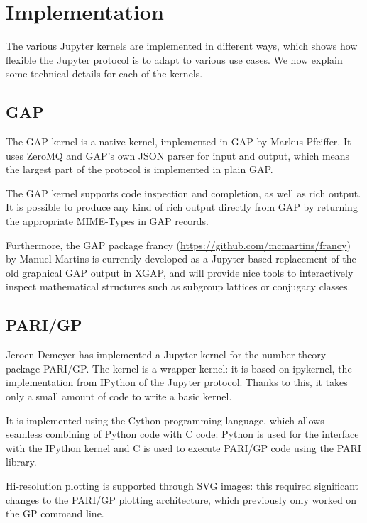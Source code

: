 \documentclass{deliverablereport}
\begin{document}

\section{Implementation}

The various Jupyter kernels are implemented in different ways, which shows how flexible
the Jupyter protocol is to adapt to various use cases. We now explain some technical details for each of the kernels.

\subsection{GAP}

The GAP kernel is a native kernel, implemented in GAP by Markus Pfeiffer. It uses ZeroMQ and GAP's own JSON
parser for input and output, which means the largest part of the protocol is implemented in plain GAP.

The GAP kernel supports code inspection and completion, as well as rich output. It is possible to produce
any kind of rich output directly from GAP by returning the appropriate MIME-Types in GAP records.

Furthermore, the GAP package francy (\url{https://github.com/mcmartins/francy}) by Manuel Martins is
currently developed as a Jupyter-based replacement of the old graphical GAP output in XGAP,
and will provide nice tools to interactively inspect mathematical structures such as subgroup lattices
or conjugacy classes.

\subsection{PARI/GP}

Jeroen Demeyer has implemented a Jupyter kernel for the number-theory package PARI/GP.
The kernel is a wrapper kernel:
it is based on ipykernel, the implementation from IPython of the Jupyter protocol.
Thanks to this, it takes only a small amount of code to write a basic kernel.

It is implemented using the Cython programming language,
which allows seamless combining of Python code with C code:
Python is used for the interface with the IPython kernel and C is used to execute PARI/GP code
using the PARI library.

Hi-resolution plotting is supported through SVG images: this required significant changes to the PARI/GP
plotting architecture, which previously only worked on the GP command line.
\end{document}
